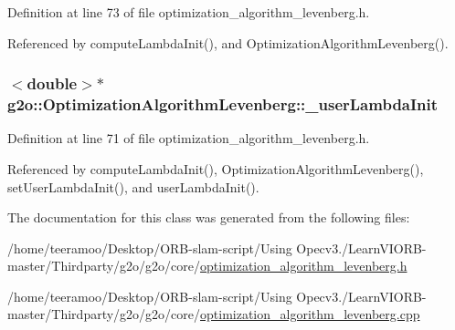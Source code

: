 Definition at line 73 of file optimization\+\_\+algorithm\+\_\+levenberg.\+h.



Referenced by compute\+Lambda\+Init(), and Optimization\+Algorithm\+Levenberg().

\subsubsection[{\texorpdfstring{\+\_\+user\+Lambda\+Init}{_userLambdaInit}}]{$<$double$>$$\ast$ g2o\+::\+Optimization\+Algorithm\+Levenberg\+::\+\_\+user\+Lambda\+Init\hspace{0.3cm}{\ttfamily [protected]}}\hypertarget{classg2o_1_1OptimizationAlgorithmLevenberg_a021c97d3f8205ec2ae7fde147f98b452}{}\label{classg2o_1_1OptimizationAlgorithmLevenberg_a021c97d3f8205ec2ae7fde147f98b452}


Definition at line 71 of file optimization\+\_\+algorithm\+\_\+levenberg.\+h.



Referenced by compute\+Lambda\+Init(), Optimization\+Algorithm\+Levenberg(), set\+User\+Lambda\+Init(), and user\+Lambda\+Init().



The documentation for this class was generated from the following files\+:\begin{DoxyCompactItemize}
\item 
/home/teeramoo/\+Desktop/\+O\+R\+B-\/slam-\/script/\+Using Opecv3./\+Learn\+V\+I\+O\+R\+B-\/master/\+Thirdparty/g2o/g2o/core/\hyperlink{optimization__algorithm__levenberg_8h}{optimization\+\_\+algorithm\+\_\+levenberg.\+h}\item 
/home/teeramoo/\+Desktop/\+O\+R\+B-\/slam-\/script/\+Using Opecv3./\+Learn\+V\+I\+O\+R\+B-\/master/\+Thirdparty/g2o/g2o/core/\hyperlink{optimization__algorithm__levenberg_8cpp}{optimization\+\_\+algorithm\+\_\+levenberg.\+cpp}\end{DoxyCompactItemize}
